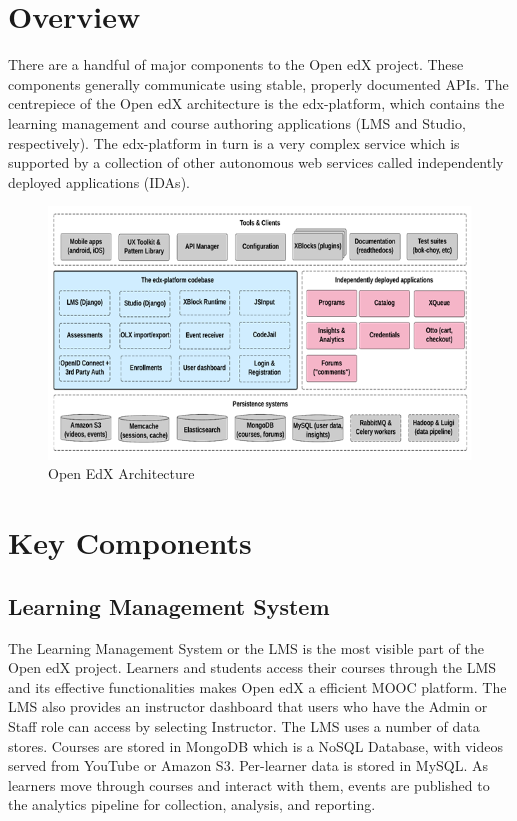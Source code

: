 \section{Overview}
There are a handful of major components to the Open edX project. These components generally
communicate using stable, properly documented APIs.\newline
The centrepiece of the Open edX architecture is the edx-platform, which contains the learning
management and course authoring applications (LMS and Studio, respectively). The edx-platform
in turn is a very complex service which is supported by a collection of other autonomous web
services called independently deployed applications (IDAs).\newline
\begin{figure}
	\includegraphics[width=\linewidth]{images/edx_arch_0.png}
	\caption{Open EdX Architecture}
	\label{Fig.1:Open edX Architecture}
\end{figure}

\section{Key Components}

\subsection{Learning Management System}
The Learning Management System or the LMS is the most visible part of the Open edX project.
Learners and students access their courses through the LMS and its effective functionalities makes
Open edX a efficient MOOC platform. The LMS also provides an instructor dashboard that users
who have the Admin or Staff role can access by selecting Instructor.\newline
The LMS uses a number of data stores. Courses are stored in MongoDB which is a NoSQL
Database, with videos served from YouTube or Amazon S3. Per-learner data is stored in MySQL.
As learners move through courses and interact with them, events are published to the analytics
pipeline for collection, analysis, and reporting.\newline

